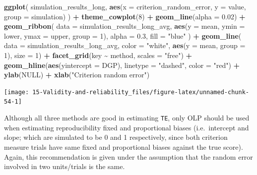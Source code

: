 \documentclass[
]{book}
\newenvironment{Shaded}{\begin{snugshade}}{\end{snugshade}}
\newcommand{\DataTypeTok}[1]{\textcolor[rgb]{0.13,0.29,0.53}{#1}}
\newcommand{\DecValTok}[1]{\textcolor[rgb]{0.00,0.00,0.81}{#1}}
\newcommand{\FloatTok}[1]{\textcolor[rgb]{0.00,0.00,0.81}{#1}}
\newcommand{\KeywordTok}[1]{\textcolor[rgb]{0.13,0.29,0.53}{\textbf{#1}}}
\newcommand{\NormalTok}[1]{#1}
\newcommand{\OperatorTok}[1]{\textcolor[rgb]{0.81,0.36,0.00}{\textbf{#1}}}
\newcommand{\OtherTok}[1]{\textcolor[rgb]{0.56,0.35,0.01}{#1}}
\newcommand{\StringTok}[1]{\textcolor[rgb]{0.31,0.60,0.02}{#1}}
\begin{document}
\begin{Shaded}
\begin{Highlighting}[]
\KeywordTok{ggplot}\NormalTok{(}
\NormalTok{  simulation\_results\_long,}
  \KeywordTok{aes}\NormalTok{(}\DataTypeTok{x =}\NormalTok{ criterion\_random\_error, }\DataTypeTok{y =}\NormalTok{ value, }\DataTypeTok{group =}\NormalTok{ simulation)}
\NormalTok{) }\OperatorTok{+}
\StringTok{  }\KeywordTok{theme\_cowplot}\NormalTok{(}\DecValTok{8}\NormalTok{) }\OperatorTok{+}
\StringTok{  }\KeywordTok{geom\_line}\NormalTok{(}\DataTypeTok{alpha =} \FloatTok{0.02}\NormalTok{) }\OperatorTok{+}
\StringTok{  }\KeywordTok{geom\_ribbon}\NormalTok{(}
    \DataTypeTok{data =}\NormalTok{ simulation\_results\_long\_avg,}
    \KeywordTok{aes}\NormalTok{(}\DataTypeTok{y =}\NormalTok{ mean, }\DataTypeTok{ymin =}\NormalTok{ lower, }\DataTypeTok{ymax =}\NormalTok{ upper, }\DataTypeTok{group =} \DecValTok{1}\NormalTok{),}
    \DataTypeTok{alpha =} \FloatTok{0.3}\NormalTok{, }\DataTypeTok{fill =} \StringTok{"blue"}
\NormalTok{  ) }\OperatorTok{+}
\StringTok{  }\KeywordTok{geom\_line}\NormalTok{(}
    \DataTypeTok{data =}\NormalTok{ simulation\_results\_long\_avg,}
    \DataTypeTok{color =} \StringTok{"white"}\NormalTok{,}
    \KeywordTok{aes}\NormalTok{(}\DataTypeTok{y =}\NormalTok{ mean, }\DataTypeTok{group =} \DecValTok{1}\NormalTok{),}
    \DataTypeTok{size =} \DecValTok{1}\NormalTok{) }\OperatorTok{+}
\StringTok{  }\KeywordTok{facet\_grid}\NormalTok{(key }\OperatorTok{\textasciitilde{}}\StringTok{ }\NormalTok{method, }\DataTypeTok{scales =} \StringTok{"free"}\NormalTok{) }\OperatorTok{+}
\StringTok{  }\KeywordTok{geom\_hline}\NormalTok{(}\KeywordTok{aes}\NormalTok{(}\DataTypeTok{yintercept =}\NormalTok{ DGP), }\DataTypeTok{linetype =} \StringTok{"dashed"}\NormalTok{, }\DataTypeTok{color =} \StringTok{"red"}\NormalTok{) }\OperatorTok{+}
\StringTok{  }\KeywordTok{ylab}\NormalTok{(}\OtherTok{NULL}\NormalTok{) }\OperatorTok{+}
\StringTok{  }\KeywordTok{xlab}\NormalTok{(}\StringTok{"Criterion random error"}\NormalTok{)}
\end{Highlighting}
\end{Shaded}

\begin{center}\texttt{[image: 15-Validity-and-reliability\_files/figure-latex/unnamed-chunk-54-1]} \end{center}

Although all three methods are good in estimating \texttt{TE}, only OLP should be used when estimating reproducibility fixed and proportional biases (i.e.~intercept and slope; which are simulated to be 0 and 1 respectively, since both criterion measure trials have same fixed and proportional biases against the true score). Again, this recommendation is given under the assumption that the random error involved in two units/trials is the same.
\end{document}
